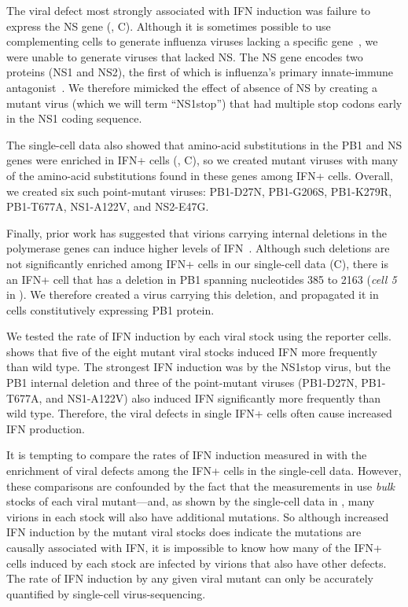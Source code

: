 \documentclass[9pt,lineno]{elife}
\begin{document}
The viral defect most strongly associated with IFN induction was failure to express the NS gene (, C).
Although it is sometimes possible to use complementing cells to generate influenza viruses lacking a specific gene~\citep{fujii2003selective,marsh2007specific}, we were unable to generate viruses that lacked NS.
The NS gene encodes two proteins (NS1 and NS2), the first of which is influenza's primary innate-immune antagonist~\citep{garcia1998influenza, hale2008multifunctional}.
We therefore mimicked the effect of absence of NS by creating a mutant virus (which we will term ``NS1stop'') that had multiple stop codons early in the NS1 coding sequence.

The single-cell data also showed that amino-acid substitutions in the PB1 and NS genes were enriched in IFN+ cells (, C), so we created mutant viruses with many of the amino-acid substitutions found in these genes among IFN+ cells.
Overall, we created six such point-mutant viruses: PB1-D27N, PB1-G206S, PB1-K279R, PB1-T677A, NS1-A122V, and NS2-E47G.

Finally, prior work has suggested that virions carrying internal deletions in the polymerase genes can induce higher levels of IFN~\citep{baum2010preference, tapia2013defective, boergeling2015evidence, dimmock2015cloned}.
Although such deletions are not significantly enriched among IFN+ cells in our single-cell data (C), there is an IFN+ cell that has a deletion in PB1 spanning nucleotides 385 to 2163 (\textit{cell 5} in ).
We therefore created a virus carrying this deletion, and propagated it in cells constitutively expressing PB1 protein.

We tested the rate of IFN induction by each viral stock using the reporter cells.
 shows that five of the eight mutant viral stocks induced IFN more frequently than wild type.
The strongest IFN induction was by the NS1stop virus, but the PB1 internal deletion and three of the point-mutant viruses (PB1-D27N, PB1-T677A, and NS1-A122V) also induced IFN significantly more frequently than wild type.
Therefore, the viral defects in single IFN+ cells often cause increased IFN production.

It is tempting to compare the rates of IFN induction measured in  with the enrichment of viral defects among the IFN+ cells in the single-cell data.
However, these comparisons are confounded by the fact that the measurements in  use \emph{bulk} stocks of each viral mutant---and, as shown by the single-cell data in , many virions in each stock will also have additional mutations.
So although increased IFN induction by the mutant viral stocks does indicate the mutations are causally associated with IFN, it is impossible to know how many of the IFN+ cells induced by each stock are infected by virions that also have other defects.
The rate of IFN induction by any given viral mutant can only be accurately quantified by single-cell virus-sequencing.
\end{document}
